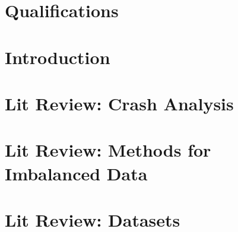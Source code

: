 \documentclass[11pt, twopage, openright]{book}
\begin{document}
\begin{spacing}{1.2}
\newpage
\chapter{Qualifications}
\label{sec:Qualifications}
\localtableofcontents\newpage



\newpage
\chapter{Introduction}
\localtableofcontents\newpage



\newpage
\chapter{Lit Review:  Crash Analysis}
\localtableofcontents\newpage



\newpage
\chapter{Lit Review: Methods for Imbalanced Data}
\label{sec:Lit_Review_Imbalanced}
\localtableofcontents\newpage











\newpage
\chapter{Lit Review:  Datasets}
\localtableofcontents\newpage



%
%
%


\end{spacing}
\end{document}
